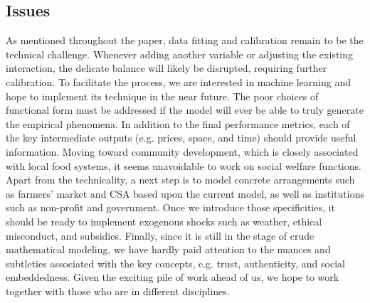 \documentclass[11pt, oneside]{article}
\begin{document}
\subsection{Issues}
As mentioned throughout the paper, data fitting and calibration remain to be the technical challenge. Whenever adding another variable or adjusting the existing interaction, the delicate balance will likely be disrupted, requiring further calibration. To facilitate the process, we are interested in machine learning and hope to implement its technique in the near future. The poor choices of functional form must be addressed if the model will ever be able to truly generate the empirical phenomena. In addition to the final performance metrics, each of the key intermediate outputs (e.g. prices, space, and time) should provide useful information. Moving toward community development, which is closely associated with local food systems, it seems unavoidable to work on social welfare functions. Apart from the technicality, a next step is to model concrete arrangements such as farmers' market and CSA based upon the current model, as well as institutions such as non-profit and government. Once we introduce those specificities, it should be ready to implement exogenous shocks such as weather, ethical misconduct, and subsidies. Finally, since it is still in the stage of crude mathematical modeling, we have hardly paid attention to the nuances and subtleties associated with the key concepts, e.g. trust, authenticity, and social embeddedness. Given the exciting pile of work ahead of us, we hope to work together with those who are in different disciplines.


\vspace{5mm}

\printbibliography[heading=bibintoc]
\end{document}
